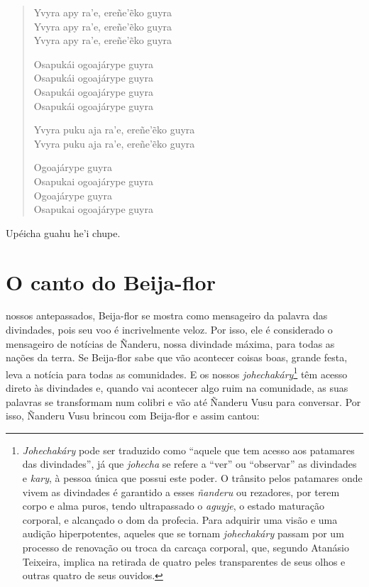 \begin{verse}
Yvyra apy ra'e, ereñe'ẽko guyra\\
Yvyra apy ra'e, ereñe'ẽko guyra\\
Yvyra apy ra'e, ereñe'ẽko guyra

Osapukái ogoajárype guyra\\
Osapukái ogoajárype guyra\\
Osapukái ogoajárype guyra\\
Osapukái ogoajárype guyra

Yvyra puku aja ra'e, ereñe'ẽko guyra\\
Yvyra puku aja ra'e, ereñe'ẽko guyra

Ogoajárype guyra\\
Osapukai ogoajárype guyra\\
Ogoajárype guyra\\
Osapukai ogoajárype guyra
\end{verse}

Upéicha guahu he'i chupe.

\chapter{O canto do Beija-flor}

 nossos antepassados, Beija-flor se mostra como mensageiro da
palavra das divindades, pois seu voo é incrivelmente veloz. Por isso,
ele é considerado o mensageiro de notícias de Ñanderu, nossa divindade
máxima, para todas as nações da terra. Se Beija-flor sabe que vão
acontecer coisas boas, grande festa, leva a notícia para todas as
comunidades. E os nossos \textit{johechakáry}\footnote{\textit{Johechakáry}
  pode ser traduzido como ``aquele que tem acesso aos patamares das
  divindades'', já que \textit{johecha} se refere a ``ver'' ou
  ``observar'' as divindades e \textit{kary}, à pessoa única que possui
  este poder. O trânsito pelos patamares onde vivem as divindades é
  garantido a esses \textit{ñanderu} ou rezadores, por terem corpo e alma
  puros, tendo ultrapassado o \textit{aguyje}, o estado maturação
  corporal, e alcançado o dom da profecia. Para adquirir uma visão e uma
  audição hiperpotentes, aqueles que se tornam \textit{johechakáry} passam
  por um processo de renovação ou troca da carcaça corporal, que,
  segundo Atanásio Teixeira, implica na retirada de quatro peles
  transparentes de seus olhos e outras quatro de seus ouvidos.} têm
acesso direto às divindades e, quando vai acontecer algo ruim na
comunidade, as suas palavras se transformam num colibri e vão até
Ñanderu Vusu para conversar. Por isso, Ñanderu Vusu brincou com
Beija-flor e assim cantou:

